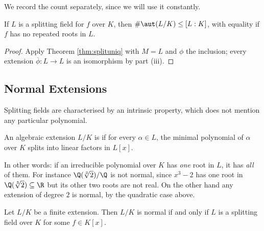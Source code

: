 We record the count separately, since we will use it constantly.

\begin{corollary}\label{cor:countaut}
	If $L$ is a splitting field for $f$ over $K$, then $\#\aut(L/K) \leq [L:K]$, with equality if $f$ has no repeated roots in $L$.
\end{corollary}

\begin{proof}
	Apply Theorem \ref{thm:splituniq} with $M = L$ and $\phi$ the inclusion; every extension $\overline\phi : L \to L$ is an isomorphism by part (iii).
\end{proof}

\subsection{Normal Extensions}

Splitting fields are characterised by an intrinsic property, which does not mention any particular polynomial.

\begin{definition}
	An algebraic extension $L/K$ is  if for every $\alpha \in L$, the minimal polynomial of $\alpha$ over $K$ splits into linear factors in $L[x]$.
\end{definition}

In other words: if an irreducible polynomial over $K$ has \emph{one} root in $L$, it has \emph{all} of them. For instance $\Q(\sqrt[3]2)/\Q$ is not normal, since $x^3-2$ has one root in $\Q(\sqrt[3]2) \subseteq \R$ but its other two roots are not real. On the other hand any extension of degree $2$ is normal, by the quadratic case above.

\begin{theorem}\label{thm:normalsplit}
	Let $L/K$ be a finite extension. Then $L/K$ is normal if and only if $L$ is a splitting field over $K$ for some $f \in K[x]$.
\end{theorem}

